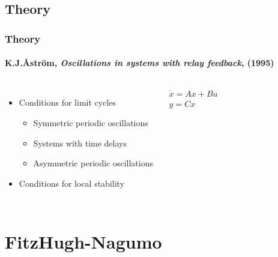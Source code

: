 \documentclass[11pt]{beamer}
\begin{document}
\subsection{Theory}
\begin{frame}
\frametitle{Theory}
\framesubtitle{K.J.\r{A}str\"{o}m, \emph{Oscillations in systems with relay feedback}, (1995)}
\begin{columns}[t,onlytextwidth]
	\begin{itemize}
    \item Conditions for limit cycles
    \begin{itemize}
      \item Symmetric periodic oscillations
      \item Systems with time delays
      \item Asymmetric periodic oscillations
    \end{itemize}
    \item Conditions for local stability
  \end{itemize}
\begin{eqnarray*}
\dot{x} = Ax + Bu \\
y = Cx 
\end{eqnarray*}

\end{columns}
\end{frame}

\section{FitzHugh-Nagumo}
\end{document}
